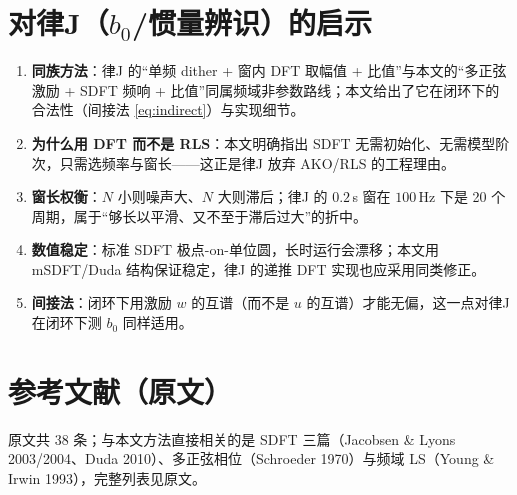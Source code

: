 \documentclass[UTF8,a4paper,11pt]{ctexart}
\begin{document}
\section{对律J（$b_0$/惯量辨识）的启示}
\begin{enumerate}
  \item \textbf{同族方法}：律J 的“单频 dither + 窗内 DFT 取幅值 + 比值”与本文的“多正弦激励 + SDFT 频响 + 比值”同属频域非参数路线；本文给出了它在闭环下的合法性（间接法 \eqref{eq:indirect}）与实现细节。
  \item \textbf{为什么用 DFT 而不是 RLS}：本文明确指出 SDFT 无需初始化、无需模型阶次，只需选频率与窗长——这正是律J 放弃 AKO/RLS 的工程理由。
  \item \textbf{窗长权衡}：$N$ 小则噪声大、$N$ 大则滞后；律J 的 $0.2$\,s 窗在 $100$\,Hz 下是 20 个周期，属于“够长以平滑、又不至于滞后过大”的折中。
  \item \textbf{数值稳定}：标准 SDFT 极点-on-单位圆，长时运行会漂移；本文用 mSDFT/Duda 结构保证稳定，律J 的递推 DFT 实现也应采用同类修正。
  \item \textbf{间接法}：闭环下用激励 $w$ 的互谱（而不是 $u$ 的互谱）才能无偏，这一点对律J 在闭环下测 $b_0$ 同样适用。
\end{enumerate}

\section*{参考文献（原文）}
原文共 38 条；与本文方法直接相关的是 SDFT 三篇（Jacobsen \& Lyons 2003/2004、Duda 2010）、多正弦相位（Schroeder 1970）与频域 LS（Young \& Irwin 1993），完整列表见原文。
\end{document}
